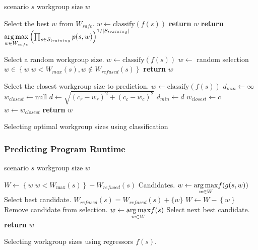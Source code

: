 \documentclass[nonatbib,preprint,10pt]{sigplanconf}
\begin{document}
\begin{algorithm}[t]
\begin{algorithmic}[1]
\Require scenario $s$
\Ensure workgroup size $w$

\Comment Select the best $w$ from $W_{safe}$.
\State $w \leftarrow \text{classify}(f(s))$
    \State \textbf{return} $w$
\Else
  \State \textbf{return} $\underset{w \in W_{safe}}{\operatorname*{arg\,max}}
\left(
  \prod_{s \in S_{training}} p(s, w)
\right)^{1/|S_{training}|}$
\EndIf
\EndProcedure
\item[] %

\Comment Select a random workgroup size.
\State $w \leftarrow \text{classify}(f(s))$
  \State $w \leftarrow $ random selection $w \in \left\{ w | w < W_{max}(s), w \not\in W_{refused}(s) \right\}$
\EndWhile
\State \textbf{return} $w$
\EndProcedure
\item[] %

\Comment Select the closest workgroup size to prediction.
\State $w \leftarrow \text{classify}(f(s))$
  \State $d_{min} \leftarrow \infty$
  \State $w_{closest} \leftarrow \text{null}$
    \State $d \leftarrow \sqrt{\left(c_r - w_r\right)^2 + \left(c_c - w_c\right)^2}$
      \State $d_{min} \leftarrow d$
      \State $w_{closest} \leftarrow c$
    \EndIf
  \EndFor
  \State $w \leftarrow w_{closest}$
\EndWhile
\State \textbf{return} $w$
\EndProcedure
\end{algorithmic}
\caption{Selecting optimal workgroup sizes using classification}
\label{alg:autotune-classification}
\end{algorithm}


\subsubsection{Predicting Program Runtime}

\begin{algorithm}[t]
\begin{algorithmic}[1]
\Require scenario $s$
\Ensure workgroup size $w$

\State $W \leftarrow \left\{ w | w < W_{\max}(s) \right\} -
W_{refused}(s)$
\Comment Candidates.
\State $w \leftarrow \underset{w \in W}{\operatorname*{arg\,max}} f(g(s, w))$
\Comment Select best candidate.
  \State $W_{refused}(s) = W_{refused}(s) + \{w\}$
  \State $W \leftarrow W - \left\{ w \right\}$
  \Comment Remove candidate from selection.
  \State $w \leftarrow \underset{w \in W}{\operatorname*{arg\,max}} f(s)$
  \Comment Select next best candidate.
\EndWhile
\State \textbf{return} $w$
\end{algorithmic}
\caption{Selecting workgroup sizes using regressors $f(s)$.}
\label{alg:autotune-regression}
\end{algorithm}
\end{document}
